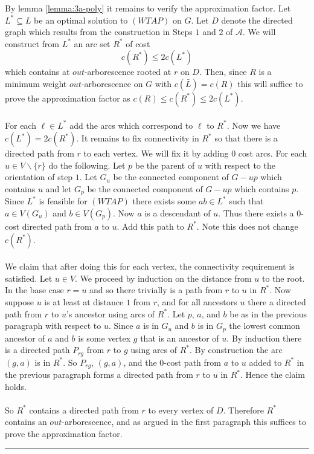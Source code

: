\documentclass[letterpaper,12pt,oneside,onecolumn]{article}
\newcommand{\cA}{\mathcal{A}} \newcommand{\cB}{\mathcal{B}}
\newenvironment{proof}{{\bf Proof:  }}{\hfill\rule{2mm}{2mm}}
\begin{document}
\begin{proof}
By lemma \ref{lemma:3a-poly} it remains to verify the approximation factor. Let $L^* \subseteq L$ be an optimal solution to $(WTAP)$ on $G$. Let $D$ denote the directed graph which results from the construction in Steps $1$ and $2$ of $\cA$. We will construct from $L^*$ an arc set $R^*$ of cost
$$c(R^*)\leq 2c(L^*)$$
which contains at $out$-arborescence rooted at $r$ on $D$.
Then, since $R$ is a minimum weight $out$-arborescence on $G$ with $c(\bar{L}) = c(R)$ this will suffice to prove the approximation factor as $c(R) \leq c(R^*) \leq 2c(L^*)$.
\paragraph{}
For each $\ell \in L^*$ add the arcs which correspond to $\ell$ to $R^*$. Now we have $c(L^*) = 2c(R^*)$. It remains to fix connectivity in $R^*$ so that there is a directed path from $r$ to each vertex. We will fix it by adding $0$ cost arcs. For each $u \in V\backslash \{r\}$ do the following. Let $p$ be the parent of $u$ with respect to the orientation of step $1$.  Let $G_u$ be the connected component of $G-up$ which contains $u$ and let $G_p$ be the connected component of $G-up$ which contains $p$. Since $L^*$ is feasible for $(WTAP)$ there exists some $ab \in L^*$ such that $a \in V(G_u)$ and $b \in V(G_p)$. Now $a$ is a descendant of $u$. Thus there exists a $0$-cost directed path from $a$ to $u$. Add this path to $R^*$. Note this does not change $c(R^*)$.
\paragraph{}
We claim that after doing this for each vertex, the connectivity requirement is satisfied. Let $u \in V$. We proceed by induction on the distance from $u$ to the root. In the base case $r=u$ and so there trivially is a path from $r$ to $u$ in $R^*$. Now suppose $u$ is at least at distance $1$ from $r$, and for all ancestors $u$ there a directed path from $r$ to $u$'s ancestor using arcs of $R^*$. Let $p$, $a$, and $b$ be as in the previous paragraph with respect to $u$. Since $a$ is in $G_u$ and $b$ is in $G_p$ the lowest common ancestor of $a$ and $b$ is some vertex $g$ that is an ancestor of $u$. By induction there is a directed path $P_{rg}$ from $r$ to $g$ using arcs of $R^*$. By construction the arc $(g,a)$ is in $R^*$. So $P_{rg}$, $(g,a)$, and the $0$-cost path from $a$ to $u$ added to $R^*$ in the previous paragraph forms a directed path from $r$ to $u$ in $R^*$. Hence the claim holds. 
\paragraph{}
So $R^*$ contains a directed path from $r$ to every vertex of $D$. Therefore $R^*$ contains an $out$-arborescence, and as argued in the first paragraph this suffices to prove the approximation factor.
\end{proof}
\end{document}
